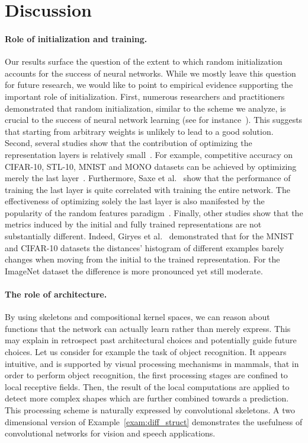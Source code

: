 \section{Discussion}\label{sec:discuss}

\paragraph{Role of initialization and training.} Our results surface the
question of the extent to which random initialization accounts for the success of
neural networks. While we mostly leave this question for future research, we
would like to point to empirical evidence supporting the important role of
initialization. First, numerous researchers and practitioners demonstrated
that random initialization, similar to the scheme we analyze, is crucial to
the success of neural network learning (see for
instance~\cite{glorot2010understanding}). This suggests that starting from
arbitrary weights is unlikely to lead to a good solution. Second,
several studies show that the contribution of optimizing the representation
layers is relatively small~\cite{saxe2011random, jarrett2009best,
pinto2009high, pinto2012evaluation, cox2011beyond}. For example, competitive
accuracy on CIFAR-10, STL-10, MNIST and MONO datasets can be achieved by
optimizing merely the last layer~\cite{mairal2014convolutional,
saxe2011random}. Furthermore, Saxe et al.~\cite{saxe2011random} show that
the performance of training the last layer is quite correlated with training
the entire network. The effectiveness of optimizing solely the last layer is
also manifested by the popularity of the random features
paradigm~\cite{rahimi2009weighted}. Finally, other studies show that the
metrics induced by the initial and fully trained representations are not
substantially different. Indeed, Giryes et al.~\cite{giryes2015deep}
demonstrated that for the MNIST and CIFAR-10 datasets the distances'
histogram of different examples barely changes when moving from the
initial to the trained representation. For the ImageNet dataset the
difference is more pronounced yet still moderate.

\paragraph{The role of architecture.} By using skeletons and compositional
kernel spaces, we can reason about functions that the network can actually
learn rather than merely express. This may explain in retrospect past
architectural choices and potentially guide future choices. Let us consider
for example the task of object recognition. It appears intuitive, and is
supported by visual processing mechanisms in mammals, that in order to
perform object recognition, the first processing stages are confined to
local receptive fields. Then, the result of the local computations are
applied to detect more complex shapes which are further combined towards a
prediction. This processing scheme is naturally expressed by convolutional
skeletons.  A two dimensional version of Example~\ref{exam:diff_struct}
demonstrates the usefulness of convolutional networks for vision and speech
applications.

